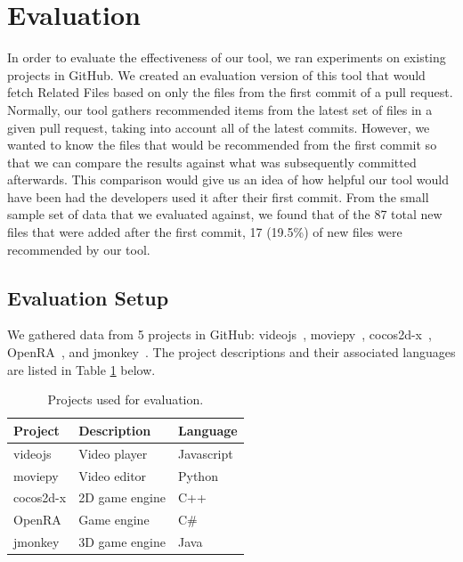 
\section{Evaluation}
\label{sec:finding}

In order to evaluate the effectiveness of our tool, we ran experiments on existing projects in GitHub. We created an evaluation version of this tool that would fetch Related Files based on only the files from the first commit of a pull request. Normally, our tool gathers recommended items from the latest set of files in a given pull request, taking into account all of the latest commits. However, we wanted to know the files that would be recommended from the first commit so that we can compare the results against what was subsequently committed afterwards. This comparison would give us an idea of how helpful our tool would have been had the developers used it after their first commit. From the small sample set of data that we evaluated against, we found that of the 87 total new files that were added after the first commit, 17 (19.5\%) of new files were recommended by our tool.

\subsection{Evaluation Setup}

We gathered data from 5 projects in GitHub: videojs~\cite{videojs}, moviepy~\cite{moviepy}, cocos2d-x~\cite{cocos2d-x}, OpenRA~\cite{OpenRA}, and jmonkey~\cite{jmonkey}. The project descriptions and their associated languages are listed in Table \ref{tab:evaluationprojects} below. 

\begin{table}[h]
\centering
\begin{tabular}{lll}
\hline
Project & Description & Language \\
\hline
videojs & Video player & Javascript \\
moviepy & Video editor & Python \\
cocos2d-x & 2D game engine & C++ \\
OpenRA & Game engine & C\# \\
jmonkey & 3D game engine & Java \\
\hline
\end{tabular}
\caption{Projects used for evaluation.}
\label{tab:evaluationprojects}
\end{table}

